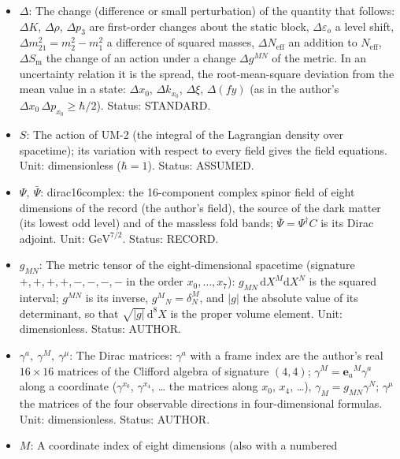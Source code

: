 \documentclass[
  10pt,
]{article}
\providecommand{\tightlist}{%
  \setlength{\itemsep}{0pt}\setlength{\parskip}{0pt}}
\begin{document}
\begin{itemize}
\tightlist
\item
  \(\Delta\): The change (difference or small perturbation) of the
  quantity that follows: \(\Delta K\), \(\Delta\rho\), \(\Delta p_3\)
  are first-order changes about the static block,
  \(\Delta\varepsilon_o\) a level shift,
  \(\Delta m^2_{21} = m_2^2 - m_1^2\) a difference of squared masses,
  \(\Delta N_{\mathrm{eff}}\) an addition to \(N_{\mathrm{eff}}\),
  \(\Delta S_{\mathrm{m}}\) the change of an action under a change
  \(\Delta g^{MN}\) of the metric. In an uncertainty relation it is the
  spread, the root-mean-square deviation from the mean value in a state:
  \(\Delta x_0\), \(\Delta k_{x_0}\), \(\Delta\xi\), \(\Delta(fy)\) (as
  in the author's \(\Delta x_0\,\Delta p_{x_0} \ge \hbar/2\)). Status:
  STANDARD.
\item
  \(S\): The action of UM-2 (the integral of the Lagrangian density over
  spacetime); its variation with respect to every field gives the field
  equations. Unit: dimensionless (\(\hbar = 1\)). Status: ASSUMED.
\item
  \(\Psi,\ \bar\Psi\): dirac16complex: the 16-component complex spinor
  field of eight dimensions of the record (the author's field), the
  source of the dark matter (its lowest odd level) and of the massless
  fold bands; \(\bar\Psi = \Psi^\dagger C\) is its Dirac adjoint. Unit:
  \(\mathrm{GeV}^{7/2}\). Status: RECORD.
\item
  \(g_{MN}\): The metric tensor of the eight-dimensional spacetime
  (signature \(+,+,+,+,-,-,-,-\) in the order \(x_0, \dots, x_7\)):
  \(g_{MN}\,\mathrm{d}X^M\mathrm{d}X^N\) is the squared interval;
  \(g^{MN}\) is its inverse, \(g^M{}_N = \delta^M_N\), and
  \(\lvert g\rvert\) the absolute value of its determinant, so that
  \(\sqrt{\lvert g\rvert}\,\mathrm{d}^8X\) is the proper volume element.
  Unit: dimensionless. Status: AUTHOR.
\item
  \(\gamma^a,\ \gamma^M,\ \gamma^\mu\): The Dirac matrices: \(\gamma^a\)
  with a frame index are the author's real \(16 \times 16\) matrices of
  the Clifford algebra of signature \((4, 4)\);
  \(\gamma^M = \mathbf{e}_a{}^M\gamma^a\) along a coordinate
  (\(\gamma^{x_0}\), \(\gamma^{x_4}\), \ldots{} the matrices along
  \(x_0\), \(x_4\), \ldots), \(\gamma_M = g_{MN}\gamma^N\);
  \(\gamma^\mu\) the matrices of the four observable directions in
  four-dimensional formulas. Unit: dimensionless. Status: AUTHOR.
\item
  \(M\): A coordinate index of eight dimensions (also with a numbered

\end{itemize}
\end{document}
